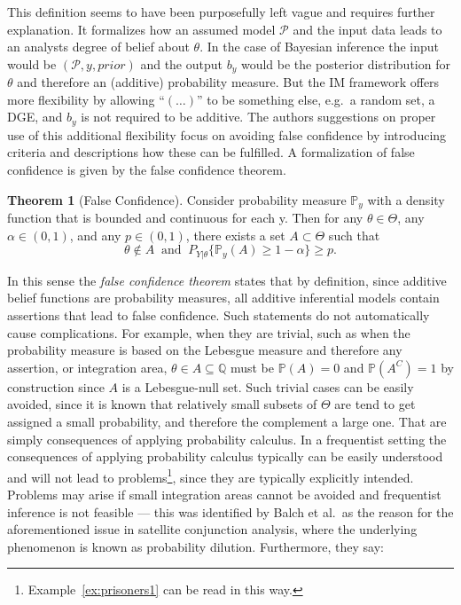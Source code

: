 \documentclass[
]{report}
\theoremstyle{definition}
\newtheorem{theorem}{Theorem}
\theoremstyle{definition}
\begin{document}
This definition seems to have been purposefully left vague and requires
further explanation. It formalizes how an assumed model \(\mathscr{P}\)
and the input data leads to an analysts degree of belief about
\(\theta\). In the case of Bayesian inference the input would be
\((\mathscr{P}, y, prior)\) and the output \(b_y\) would be the
posterior distribution for \(\theta\) and therefore an (additive)
probability measure. But the IM framework offers more flexibility by
allowing ``\((\dots)\)'' to be something else, e.g.~a random set, a DGE,
and \(b_y\) is not required to be additive. The authors suggestions on
proper use of this additional flexibility focus on avoiding false
confidence by introducing criteria and descriptions how these can be
fulfilled. A formalization of false confidence is given by the false
confidence theorem.

\begin{theorem}[False Confidence] Consider probability measure $\mathbb{P}_y$ with a density function that is bounded and continuous for each y. Then for any $\theta \in \Theta$, any $\alpha \in (0,1)$, and any $p \in (0,1)$, there exists a set $A \subset \Theta$ such that
$$\theta \notin A  \ \text{ and } \ P_{Y| \theta} \{\mathbb{P}_y (A) \geq 1 - \alpha \} \geq p.$$
\end{theorem}

In this sense the \textit{false confidence theorem} states that by
definition, since additive belief functions are probability measures,
all additive inferential models contain assertions that lead to false
confidence. Such statements do not automatically cause complications.
For example, when they are trivial, such as when the probability measure
is based on the Lebesgue measure and therefore any assertion, or
integration area, \(\theta \in A \subseteq \mathbb{Q}\) must be
\(\mathbb{P}(A) = 0\) and \(\mathbb{P}(A^C) = 1\) by construction since
\(A\) is a Lebesgue-null set. Such trivial cases can be easily avoided,
since it is known that relatively small subsets of \(\Theta\) are tend
to get assigned a small probability, and therefore the complement a
large one. That are simply consequences of applying probability
calculus. In a frequentist setting the consequences of applying
probability calculus typically can be easily understood and will not
lead to
problems\footnote{Example~\ref{ex:prisoners1} can be read in this way.},
since they are typically explicitly intended. Problems may arise if
small integration areas cannot be avoided and frequentist inference is
not feasible --- this was identified by Balch et al.~as the reason for
the aforementioned issue in satellite conjunction analysis, where the
underlying phenomenon is known as probability dilution. Furthermore,
they say:
\end{document}

